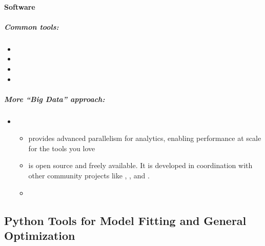 \documentclass[letterpaper,10pt,english]{sphinxmanual}
\begin{document}
\paragraph{Software}
\label{\detokenize{resource/programing/python_performance:software}}

\subparagraph{Common tools:}
\label{\detokenize{resource/programing/python_performance:common-tools}}\begin{itemize}
\item {} 

\item {} 

\item {} 

\item {} 

\end{itemize}


\subparagraph{More “Big Data” approach:}
\label{\detokenize{resource/programing/python_performance:more-big-data-approach}}\begin{itemize}
\item {} 
\begin{itemize}
\item {} 
 provides advanced parallelism for analytics, enabling
performance at scale for the tools you love

\item {} 
 is open source and freely available. It is developed in
coordination with other community projects like ,
, and .

\item {} 

\end{itemize}

\end{itemize}


\subsection{Python Tools for Model Fitting and General Optimization}
\label{\detokenize{resource/programing/python_optimization:python-tools-for-model-fitting-and-general-optimization}}\label{\detokenize{resource/programing/python_optimization::doc}}
\end{document}
